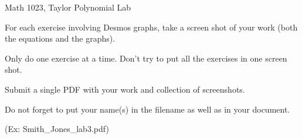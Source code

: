 \documentclass[12pt]{article}
\begin{document}
\begin{large}
\noindent Math 1023, Taylor Polynomial Lab
\end{large} \newline

\noindent For each exercise involving Desmos graphs, take a screen shot of your work (both the equations and the graphs). \newline

\noindent Only do one exercise at a time. Don’t try to put all the exercises in one screen shot. \newline

\noindent Submit a single PDF with your work and collection of screenshots. \newline

\noindent Do not forget to put your name(s) in the filename as well as in your document. \newline

\noindent (Ex: Smith\_Jones\_lab3.pdf)
\end{document}
